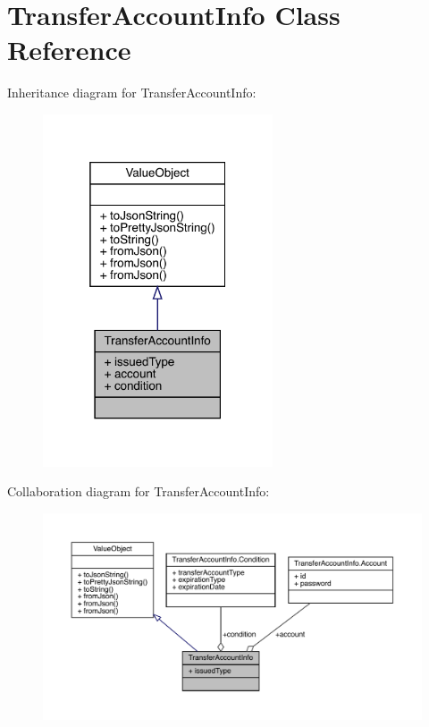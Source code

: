 \hypertarget{classcom_1_1toast_1_1android_1_1gamebase_1_1auth_1_1transfer_1_1data_1_1_transfer_account_info}{}\section{Transfer\+Account\+Info Class Reference}
\label{classcom_1_1toast_1_1android_1_1gamebase_1_1auth_1_1transfer_1_1data_1_1_transfer_account_info}


Inheritance diagram for Transfer\+Account\+Info\+:
\nopagebreak
\begin{figure}[H]
\begin{center}
\leavevmode
\includegraphics[width=193pt]{classcom_1_1toast_1_1android_1_1gamebase_1_1auth_1_1transfer_1_1data_1_1_transfer_account_info__inherit__graph}
\end{center}
\end{figure}


Collaboration diagram for Transfer\+Account\+Info\+:
\nopagebreak
\begin{figure}[H]
\begin{center}
\leavevmode
\includegraphics[width=350pt]{classcom_1_1toast_1_1android_1_1gamebase_1_1auth_1_1transfer_1_1data_1_1_transfer_account_info__coll__graph}
\end{center}
\end{figure}

